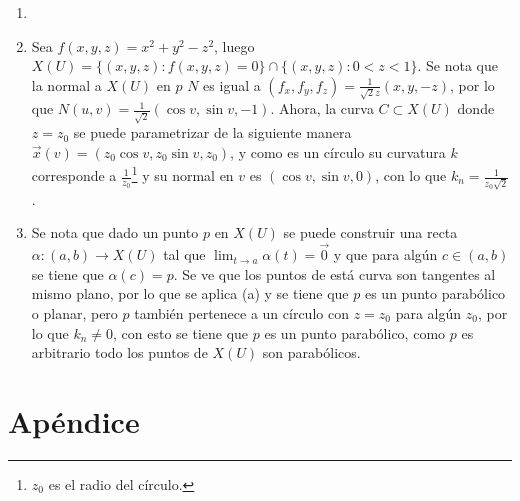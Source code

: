 \documentclass{homework}
\begin{document}
\begin{sol}[5]
    \begin{enumerate}
        \item 
        \item Sea \(f(x,y,z)=x^2+y^2-z^2\), luego \(X(U)=\{(x,y,z):f(x,y,z)=0\}\cap\{(x,y,z):0<z<1\}\). Se nota que la normal a \(X(U)\) en \(p\) \(N\) es igual a \((f_x,f_y,f_z)=\frac1{\sqrt{2}z}(x,y,-z)\), por lo que \(N(u,v)=\frac1{\sqrt{2}}(\cos v,\sin v, -1)\). Ahora, la curva \(C\subset X(U)\) donde \(z=z_0\) se puede parametrizar de la siguiente manera \(\vec{x}(v)=(z_0\cos v,z_0 \sin v, z_0)\), y como es un círculo su curvatura \(k\) corresponde a \(\frac1{z_0}\)\footnote{\(z_0\) es el radio del círculo.} y su normal en \(v\) es \((\cos v,\sin v, 0)\), con lo que \(k_n=\frac1{z_0\sqrt{2}}\).
        \item Se nota que dado un punto \(p\) en \(X(U)\) se puede construir una recta \(\alpha:(a,b)\rightarrow X(U)\) tal que \(\lim_{t\rightarrow a}\alpha(t)=\vec{0}\) y que para algún \(c\in(a,b)\) se tiene que \(\alpha(c)=p\). Se ve que los puntos de está curva son tangentes al mismo plano, por lo que se aplica (a) y se tiene que \(p\) es un punto parabólico o planar, pero \(p\) también pertenece a un círculo con \(z=z_0\) para algún \(z_0\), por lo que \(k_n\neq0\), con esto se tiene que \(p\) es un punto parabólico, como \(p\) es arbitrario todo los puntos de \(X(U)\) son parabólicos.
    \end{enumerate}
\end{sol}

\section*{Apéndice}
\begin{center}
    
\end{center}
\end{document}
